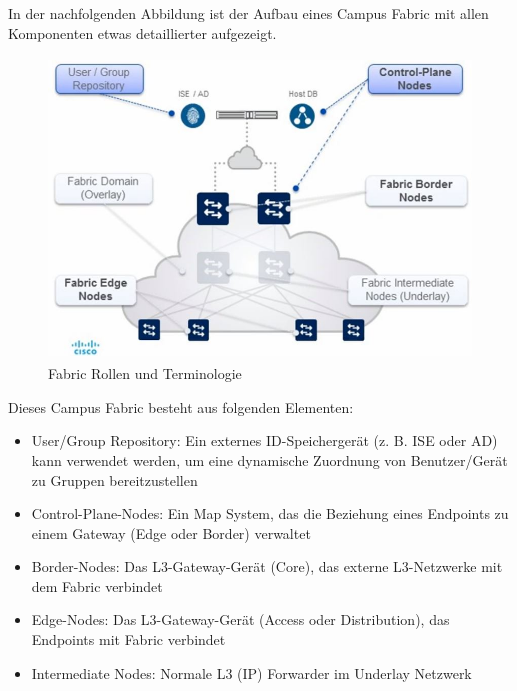 In der nachfolgenden Abbildung ist der Aufbau eines Campus Fabric mit allen Komponenten etwas detaillierter aufgezeigt.

\begin{figure}[H]
	\centering
	\includegraphics[height=8cm]{img/fabric-roles&terminology.jpg}
	\caption{Fabric Rollen und Terminologie}
	\label{fig:Fabric Rollen und Terminologie}
\end{figure}

Dieses Campus Fabric besteht aus folgenden Elementen:
\begin{itemize}	
	\item User/Group Repository: Ein externes ID-Speichergerät (z. B. ISE oder AD) kann verwendet werden, um eine dynamische Zuordnung von Benutzer/Gerät zu Gruppen bereitzustellen
	\item Control-Plane-Nodes: Ein Map System, das die Beziehung eines Endpoints zu einem Gateway (Edge oder Border) verwaltet
	\item Border-Nodes: Das L3-Gateway-Gerät (Core), das externe L3-Netzwerke mit dem Fabric verbindet
	\item Edge-Nodes: Das L3-Gateway-Gerät (Access oder Distribution), das Endpoints mit Fabric verbindet
	\item Intermediate Nodes: Normale L3 (IP) Forwarder im Underlay Netzwerk
\end{itemize}


